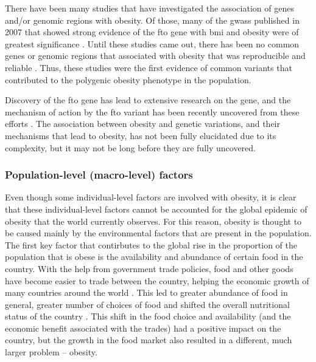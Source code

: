 There have been many studies that have investigated the association of genes and/or genomic regions with obesity.
Of those, many of the \glspl{gwas} published in 2007 that showed strong evidence of the \gls{fto} gene with \gls{bmi} and obesity were of greatest significance \citep{Dina2007,Frayling2007,Gerken2007,Scuteri2007}.
Until these studies came out, there has been no common genes or genomic regions that associated with obesity that was reproducible and reliable \citep{Frayling2007}.
Thus, these studies were the first evidence of common variants that contributed to the polygenic obesity phenotype in the population.

Discovery of the \gls{fto} gene has lead to extensive research on the gene, and the mechanism of action by the \gls{fto} variant has been recently uncovered  from these efforts \citep{Claussnitzer2015a,Smemo2014a}.
The association between obesity and genetic variations, and their mechanisms that lead to obesity, has not been fully elucidated due to its complexity, but it may not be long before they are fully uncovered.


\subsubsection{Population-level (macro-level) factors}
\label{ssub:Population-level_(macro-level)_factors}

Even though some individual-level factors are involved with obesity, it is clear that these individual-level factors cannot be accounted for the global epidemic of obesity that the world currently observes.
For this reason, obesity is thought to be caused mainly by the environmental factors that are present in the population.\\

\noindent
The first key factor that contirbutes to the global rise in the proportion of the population that is obese is the availability and abundance of certain food in the country.
With the help from government trade policies, food and other goods have become easier to trade between the country, helping the economic growth of many countries around the world \citep{Kearney2010}.
This led to greater abundance of food in general, greater number of choices of food and shifted the overall nutritional status of the country \citep{Malik2013}.
This shift in the food choice and availability (and the economic benefit associated with the trades) had a positive impact on the country, but the growth in the food market also resulted in a different, much larger problem -- obesity.

